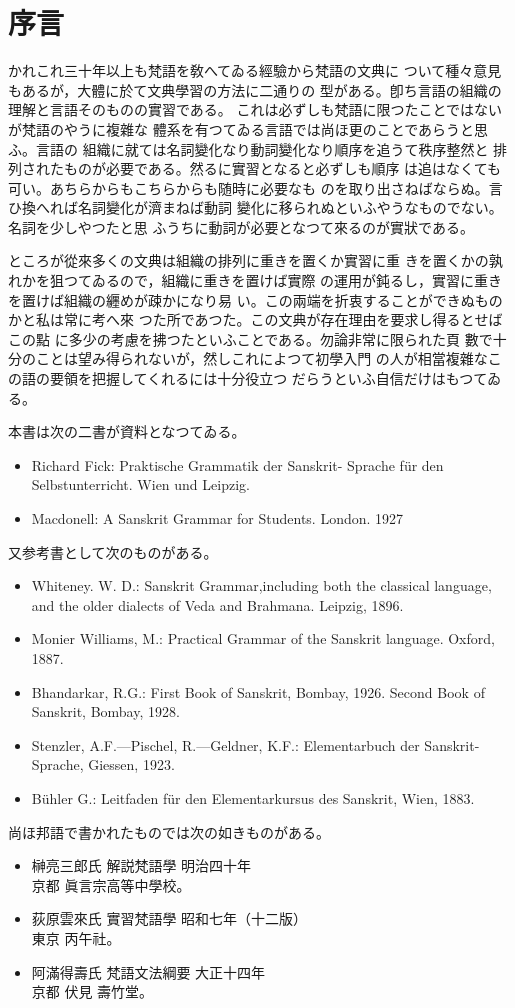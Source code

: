 \chapter*{序言}
\label{cha:preface}
かれこれ三十年以上も梵語を敎へてゐる經驗から梵語の文典に
ついて種々意見もあるが，大體に於て文典學習の方法に二通りの
型がある。卽ち言語の組織の理解と言語そのものの實習である。
これは必ずしも梵語に限つたことではないが梵語のやうに複雜な
體系を有つてゐる言語では尚ほ更のことであらうと思ふ。言語の
組織に就ては名詞變化なり動詞變化なり順序を追うて秩序整然と
排列されたものが必要である。然るに實習となると必ずしも順序
は追はなくても可い。あちらからもこちらからも随時に必要なも
のを取り出さねばならぬ。言ひ換へれば名詞變化が濟まねば動詞
變化に移られぬといふやうなものでない。名詞を少しやつたと思
ふうちに動詞が必要となつて來るのが實狀である。

ところが從來多くの文典は組織の排列に重きを置くか實習に重
きを置くかの孰れかを狙つてゐるので，組織に重きを置けば實際
の運用が鈍るし，實習に重きを置けば組織の纒めが疎かになり易
い。この兩端を折衷することができぬものかと私は常に考へ來
つた所であつた。この文典が存在理由を要求し得るとせばこの點
に多少の考慮を拂つたといふことである。勿論非常に限られた頁
數で十分のことは望み得られないが，然しこれによつて初學入門
の人が相當複雜なこの語の要領を把握してくれるには十分役立つ
だらうといふ自信だけはもつてゐる。

本書は次の二書が資料となつてゐる。
\begin{itemize}
\item Richard Fick: Praktische Grammatik der Sanskrit-
Sprache für den Selbstunterricht. Wien und Leipzig.
\item Macdonell: A Sanskrit Grammar for Students. London. 1927
\end{itemize}

又参考書として次のものがある。
\begin{itemize}
\item Whiteney. W. D.: Sanskrit Grammar,including both the
classical language, and the older dialects of Veda and Brahmana. Leipzig, 1896.
\item Monier Williams, M.: Practical Grammar of the San\-skrit language. Oxford, 1887.
\item Bhandarkar, R.G.: First Book of Sanskrit, Bombay, 1926. Second Book of Sanskrit, Bombay, 1928.
\item Stenzler, A.F.---Pischel, R.---Geldner, K.F.: Elementar\-buch der Sanskrit-Sprache, Giessen, 1923.
\item Bühler G.: Leitfaden für den Elementarkursus des Sanskrit, Wien, 1883.
\end{itemize}

尚ほ邦語で書かれたものでは次の如きものがある。
\begin{itemize}
\item 榊亮三郎氏 解説梵語學 明治四十年\\
\hfil 京都 眞言宗高等中學校。
\item 荻原雲來氏 實習梵語學 昭和七年（十二版）\\
\hfil 東京 丙午社。
\item 阿滿得壽氏 梵語文法綱要 大正十四年\\
\hfil 京都 伏見 壽竹堂。
\end{itemize}

